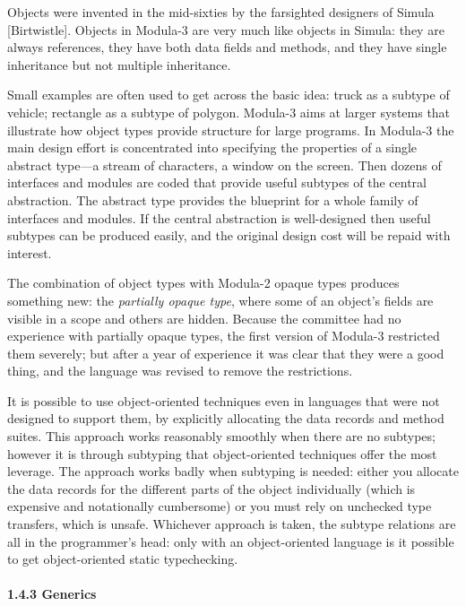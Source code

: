 \documentclass[10pt]{article}
\begin{document}
Objects were invented in the mid-sixties by the farsighted designers of Simula
[Birtwistle].  Objects in Modula-3 are very much like objects in Simula: they
are always references, they have both data fields and methods, and they have
single inheritance but not multiple inheritance.

Small examples are often used to get across the basic idea: truck as a subtype
of vehicle; rectangle as a subtype of polygon.  Modula-3 aims at larger
systems that illustrate how object types provide structure for large programs.
In Modula-3 the main design effort is concentrated into specifying the
properties of a single abstract type---a stream of characters, a window on the
screen.  Then dozens of interfaces and modules are coded that provide useful
subtypes of the central abstraction.  The abstract type provides the blueprint
for a whole family of interfaces and modules.  If the central abstraction is
well-designed then useful subtypes can be produced easily, and the original
design cost will be repaid with interest.

The combination of object types with Modula-2 opaque types produces something
new: the \emph{partially opaque type}, where some of an object's fields are
visible in a scope and others are hidden.  Because the committee had no
experience with partially opaque types, the first version of Modula-3
restricted them severely; but after a year of experience it was clear that
they were a good thing, and the language was revised to remove the
restrictions.

It is possible to use object-oriented techniques even in languages that were
not designed to support them, by explicitly allocating the data records and
method suites.  This approach works reasonably smoothly when there are no
subtypes; however it is through subtyping that object-oriented techniques
offer the most leverage.  The approach works badly when subtyping is needed:
either you allocate the data records for the different parts of the object
individually (which is expensive and notationally cumbersome) or you must rely
on unchecked type transfers, which is unsafe.  Whichever approach is taken,
the subtype relations are all in the programmer's head: only with an
object-oriented language is it possible to get object-oriented static
typechecking.

\paragraph{1.4.3 Generics}
\end{document}
